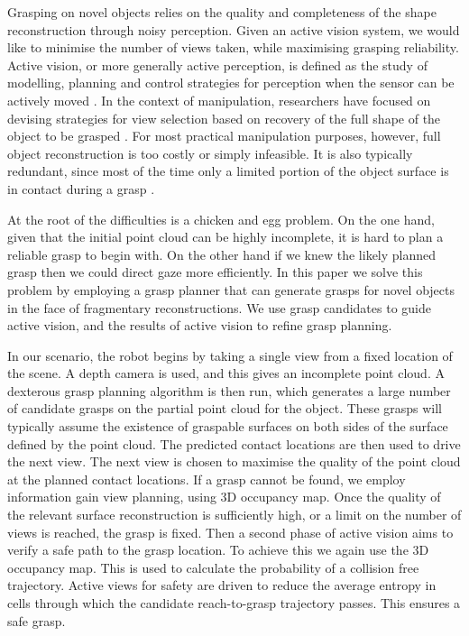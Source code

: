 \documentclass[a4paper,11pt,pdf]{../templates/pacmanreport}
\begin{document}
Grasping on novel objects relies on the quality and completeness of the shape reconstruction through noisy perception. Given an active vision system, we would like to minimise the number of views taken, while maximising grasping reliability. Active vision, or more generally active perception, is defined as the study of modelling, planning and control strategies for perception when the sensor can be actively moved \cite{Bajcsy88activeperception}. In the context of manipulation, researchers have focused on devising strategies for view selection based on recovery of the full shape of the object to be grasped \cite{krainin2011autonomous,Chen2011IJRoboticRes}. For most practical manipulation purposes, however, full object reconstruction is too costly or simply infeasible. It is also typically redundant, since most of the time only a limited portion of the object surface is in contact during a grasp  \cite{kopicki2015}. 

At the root of the difficulties is a chicken and egg problem. On the one hand, given that the initial point cloud can be highly incomplete, it is hard to plan a reliable grasp to begin with. On the other hand if we knew the likely planned grasp then we could direct gaze more efficiently. In this paper we solve this problem by employing a grasp planner that can generate grasps for novel objects in the face of fragmentary reconstructions. We use grasp candidates to guide active vision, and the results of active vision to refine grasp planning.

In our scenario, the robot begins by taking a single view from a fixed location of the scene. A depth camera is used, and this gives an incomplete point cloud. A dexterous grasp planning algorithm is then run, which generates a large number of candidate grasps on the partial point cloud for the object. These grasps will typically assume the existence of graspable surfaces on both sides of the surface defined by the point cloud. The predicted contact locations are then used to drive the next view. The next view is chosen to maximise the quality of the point cloud at the planned contact locations. If a grasp cannot be found, we employ information gain view planning, using 3D occupancy map. Once the quality of the relevant surface reconstruction is sufficiently high, or a limit on the number of views is reached, the grasp is fixed. Then a second phase of active vision aims to verify a safe path to the grasp location. To achieve this we again use the 3D occupancy map. This is used to calculate the probability of a collision free trajectory. Active views for safety are driven to reduce the average entropy in cells through which the candidate reach-to-grasp trajectory passes. This ensures a safe grasp.
\end{document}
